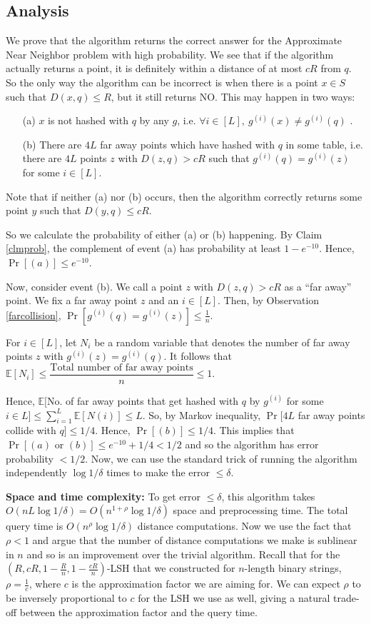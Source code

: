 \documentclass[11pt]{article}
\begin{document}
\subsection*{Analysis}
We prove that the algorithm returns the correct answer for the {\sc Approximate Near Neighbor} problem with high probability. We see that if the algorithm actually returns a point, it is definitely within a distance of at most $cR$ from $q$. So the only way the algorithm can be incorrect is when there is a point $x\in S$ such that $D(x,q)\leq R$, but it still returns NO. This may happen in two ways:
\begin{itemize}
    \item[(a)] $x$ is not hashed with $q$ by any $g$, i.e. $\forall i\in[L],~g^{(i)}(x)\ne g^{(i)}(q)$ .
    \item[(b)] There are $4L$ far away points which have hashed with $q$ in some table, i.e. there are $4L$ points $z$ with $D(z,q)>cR$ such that $g^{(i)}(q)= g^{(i)}(z)$ for some $i\in[L]$. 
\end{itemize}

Note that if neither (a) nor (b) occurs, then the algorithm correctly returns some point $y$ such that $D(y,q) \leq cR$.

So we calculate the probability of either (a) or (b) happening. 
By Claim \ref{clmprob}, the complement of event (a) has probability at least $1-e^{-10}$. Hence, $\Pr[(a)] \leq e^{-10}$.

Now, consider event (b). We call a point $z$ with $D(z,q)>cR$ as a ``far away'' point. We fix a far away point $z$ and an $i\in [L]$. Then, by Observation \ref{farcollision}, $\Pr[g^{(i)}(q)=g^{(i)}(z)]\leq \frac1n$. 

For $i\in [L]$, let $N_i$ be a random variable that denotes the number of far away points $z$ with  $g^{(i)}(z)=g^{(i)}(q)$. It follows that $\mathbb{E}[N_i]\leq \dfrac{\text{Total number of far away points}}{n}\leq 1$. 

Hence, $\mathbb{E}[$No. of far away points that get hashed with $q$ by $g^{(i)}$ for some $i\in L] \leq \sum\limits_{i=1}^L \mathbb{E}[N(i)] \leq L$. So, by Markov inequality, $\Pr[4L$ far away points collide with $q] \leq 1/4$. Hence, $\Pr[(b)]\leq 1/4$. This implies that $\Pr[(a)\text{ or }(b)] \leq e^{-10} + 1/4 < 1/2$ and so
the algorithm has error probability $<1/2$. Now, we can use the standard trick of running the algorithm independently $\log 1/\delta$ times to make the error $\leq \delta$.

\noindent
\textbf{Space and time complexity:} To get error $\leq \delta$, this algorithm takes $O(nL\log 1/\delta) = O(n^{1+\rho}\log 1/\delta)$ space and preprocessing time. The total query time is $O(n^{\rho}\log 1/\delta)$ distance computations. Now we use the fact that $\rho < 1$ and argue that the number of distance computations we make is sublinear in $n$ and so is an improvement over the trivial algorithm. Recall that for the $(R,cR,1-\frac{R}{n},1-\frac{cR}{n})$-LSH that we constructed for $n$-length binary strings, $\rho=\frac{1}{c}$, where $c$ is the approximation factor we are aiming for. We can expect $\rho$ to be inversely proportional to $c$ for the LSH we use as well, giving a natural trade-off between the approximation factor and the query time. 
\end{document}
